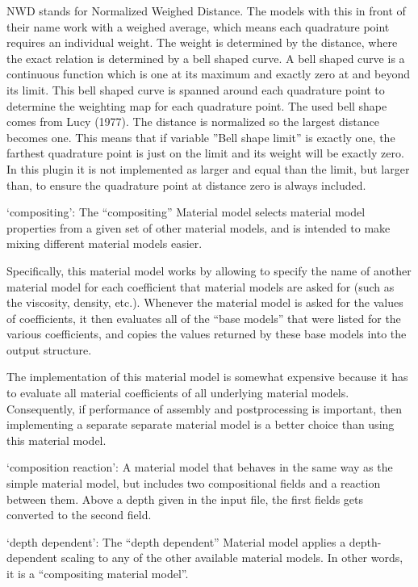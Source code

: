 \begin{itemize}
NWD stands for Normalized Weighed Distance. The models with this in front of their name work with a weighed average, which means each quadrature point requires an individual weight. The weight is determined by the distance, where the exact relation is determined by a bell shaped curve. A bell shaped curve is a continuous function which is one at its maximum and exactly zero at and beyond its limit. This bell shaped curve is spanned around each quadrature point to determine the weighting map for each quadrature point. The used bell shape comes from Lucy (1977). The distance is normalized so the largest distance becomes one. This means that if variable ''Bell shape limit'' is exactly one, the farthest quadrature point is just on the limit and its weight will be exactly zero. In this plugin it is not implemented as larger and equal than the limit, but larger than, to ensure the quadrature point at distance zero is always included.

`compositing': The ``compositing'' Material model selects material model properties from a given set of other material models, and is intended to make mixing different material models easier.

Specifically, this material model works by allowing to specify the name of another material model for each coefficient that material models are asked for (such as the viscosity, density, etc.). Whenever the material model is asked for the values of coefficients, it then evaluates all of the ``base models'' that were listed for the various coefficients, and copies the values returned by these base models into the output structure.

The implementation of this material model is somewhat expensive because it has to evaluate all material coefficients of all underlying material models. Consequently, if performance of assembly and postprocessing is important, then implementing a separate separate material model is a better choice than using this material model.

`composition reaction': A material model that behaves in the same way as the simple material model, but includes two compositional fields and a reaction between them. Above a depth given in the input file, the first fields gets converted to the second field. 

`depth dependent': The ``depth dependent'' Material model applies a depth-dependent scaling to any of the other available material models. In other words, it is a ``compositing material model''.


\end{itemize}
